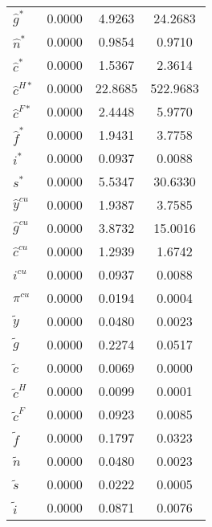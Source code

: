 \begin{center}
\begin{longtable}{lccc}
${\hat g^*}            $	 & 	       0.0000	 & 	       4.9263	 & 	      24.2683 \\ 
${\hat n^*}            $	 & 	       0.0000	 & 	       0.9854	 & 	       0.9710 \\ 
${\hat c^*}            $	 & 	       0.0000	 & 	       1.5367	 & 	       2.3614 \\ 
${\hat c^{H*}}         $	 & 	       0.0000	 & 	      22.8685	 & 	     522.9683 \\ 
${\hat c^{F*}}         $	 & 	       0.0000	 & 	       2.4448	 & 	       5.9770 \\ 
${\hat f^*}            $	 & 	       0.0000	 & 	       1.9431	 & 	       3.7758 \\ 
${i^*}                 $	 & 	       0.0000	 & 	       0.0937	 & 	       0.0088 \\ 
${s^*}                 $	 & 	       0.0000	 & 	       5.5347	 & 	      30.6330 \\ 
${\hat y^{cu}}         $	 & 	       0.0000	 & 	       1.9387	 & 	       3.7585 \\ 
${\hat g^{cu}}         $	 & 	       0.0000	 & 	       3.8732	 & 	      15.0016 \\ 
${\hat c^{cu}}         $	 & 	       0.0000	 & 	       1.2939	 & 	       1.6742 \\ 
${i^{cu}}              $	 & 	       0.0000	 & 	       0.0937	 & 	       0.0088 \\ 
${\pi^{cu}}            $	 & 	       0.0000	 & 	       0.0194	 & 	       0.0004 \\ 
${\tilde y}            $	 & 	       0.0000	 & 	       0.0480	 & 	       0.0023 \\ 
${\tilde g}            $	 & 	       0.0000	 & 	       0.2274	 & 	       0.0517 \\ 
${\tilde c}            $	 & 	       0.0000	 & 	       0.0069	 & 	       0.0000 \\ 
${\tilde c^H}          $	 & 	       0.0000	 & 	       0.0099	 & 	       0.0001 \\ 
${\tilde c^F}          $	 & 	       0.0000	 & 	       0.0923	 & 	       0.0085 \\ 
${\tilde f}            $	 & 	       0.0000	 & 	       0.1797	 & 	       0.0323 \\ 
${\tilde n}            $	 & 	       0.0000	 & 	       0.0480	 & 	       0.0023 \\ 
${\tilde s}            $	 & 	       0.0000	 & 	       0.0222	 & 	       0.0005 \\ 
${\tilde i}            $	 & 	       0.0000	 & 	       0.0871	 & 	       0.0076 \\ 

\end{longtable}
\end{center}
